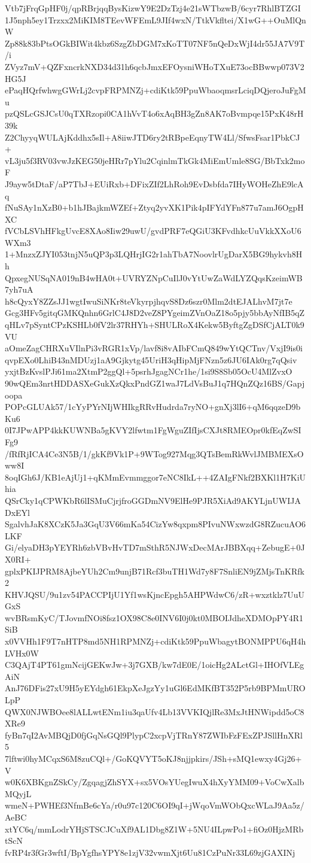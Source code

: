Vtb7jFrqGpHF0j/qpRBrjqqBysKizwY9E2DzTzj4e21sWTbzwB/6cyr7RhlBTZGI
1J5nph5ey1Trzxx2MiKIM8TEevWFEmL9JIf4wxN/TtkVkfltei/X1wG++OuMlQnW
Zp88k83bPtsOGkBIWit4kbz6SzgZbDGM7xKoTT07NF5nQeDxWjI4dr55JA7V9T/i
ZVyz7mV+QZFxncrkNXD34d31h6qcbJmxEFOysniWHoTXuE73ocBBwwp073V2HG5J
ePaqHQrfwhwgGWrLj2cvpFRPMNZj+cdiKtk59PpuWbaoqmsrLciqDQjeroJuFgMu
pzQSLcGSJCsU0qTXRzopi0CA1hVvT4o6xAqBH3gZn8AK7oBvmpqe15PxK48rH39k
Z2ChyyqWULAjKddhx5sIl+A8iiwJTD6ry2tRBpeEqnyTW4Ll/SfwsFsar1PbkCJ+
vL3ju5f3RV03vwJzKEG50jeHRr7pYlu2CqinlmTkGk4MiEmUmle8SG/BbTxk2moF
J9ayw5tDtaF/aP7TbJ+EUiRxb+DFixZIf2LhRoh9EvDsbfda7IHyWOHeZhE9lcAq
fNuSAy1nXzB0+b1hJBajkmWZEf+Ztyq2yvXK1Pik4pIFYdYFn877u7amJ6OgpHXC
fVCbLSVhHFkgUvcE8XAo8Iiw29uwU/gvdPRF7eQGiU3KFvdhkcUuVkkXXoU6WXm3
1+MnzxZJYI053tnjN5uQP3p3LQHrjIG2r1ahTbA7NoovlrUgDarX5BG9hykvh8Hh
QpxegNUSqNA019nB4wHA0t+UVRYZNpCuIlJ0vYtUwZaWdLYZQqsKzeimWB7yh7uA
h8cQyxY8ZZsJJ1wgtIwuSiNKr8teVkyrpjhqvS8Dz6szr0Mlm2dtEJALhvM7jt7e
Gcg3HFv5gitqGMKQnhn6GrlC4J8D2veZ8PYgeimZVnOaZ18o5pjy5bbAyNfIB5qZ
qHLv7pSyntCPzKSHLb0fV2lr37RHYh+SHULRoX4Kekw5ByftgZgDSfCjALT0k9VU
aOmeZagCHRXuVIlnPi3vRGR1xVp/lavf8i8vAIbFCmQ849wYtQCTnv/VxjI9is0i
qvpEXo0LhiB43nMDUzj1aA9Gjkytg45UriH3qHipMjFNzn5z6JU6IAk0rg7qQsiv
yxjtBzKvslPJi61ma2XtmP2ggQl+5psrhJgagNCr1he/1si9S8Sb05OcU4MlZvxO
90wQEm3nrtHDDASXeGukXzQkxPndGZ1waJ7LdVsBuJ1q7HQnZQz16BS/Gapjoopa
POPcGLUAk57/1cYyPYrNIjWHIkgRRvHudrda7ryNO+gnXj3lI6+qM6qqzeD9bKu6
0I7JPwAPP4kkKUWNBa5gKVY2lfwtm1FgWguZIfIjsCXJt8RMEOpr0kfEqZwSIFg9
/fRfRjICA4Ce3N5B/1/gkKf9Vk1P+9WTog927Mqg3QTsBemRkWvlJMBMEXsOww8I
8oqIGh6J/KB1eAjUj1+qKMmEvmmggor7eNC8IkL++4ZAIgFNkf2BXKl1H7KiUhia
QSrCky1qCPWKbR6lISMuCjrjfroGGDmNV9ElHe9PJR5XiAd9AKYLjnUWIJADxEYl
SgalvhJaK8XCzK5Ja3GqU3V66mKa54CizYw8qxpm8PIvuNWxwzdG8RZucuAO6LKF
Gi/elyaDH3pYEYRh6zbVBvHvTD7mSthR5NJWxDecMArJBBXqq+ZebugE+0JX0RI+
gplxPKIJPRM8AjbeYUh2Cm9unjB71Rcf3buTH1Wd7y8F7SnliEN9jZMjsTnKRfk2
KHVJQSU/9u1zv54PACCPIjU1Yf1wsKjncEpgh5AHPWdwC6/zR+wxztklz7UuUGxS
wvBRsmKyC/TJovmfNOi8fsz1OX98C8e0INV6I0j0kt0MBOIJdheXDMOpPY4R1SiB
x0VVHh1F9T7nHTP8md5NH1RPMNZj+cdiKtk59PpuWbagytBONMPPU6qH4hLVHx0W
C3QAjT4PT61gmNcijGEKwJw+3j7GXB/kw7dE0E/1oicHg2ALctGl+IHOfVLEgAiN
AnJ76DFis27xU9H5yEYdgh61EkpXeJgzYy1uGl6EdMKfBT352P5rb9BPMmUROLpP
QWX0NJWBOee8lALLwtENm1iu3qaUfv4Lb13VVKIQjlRe3MxJtHNWipdd5oC8XRe9
fyBn7qI2AvMBQjD0fjGqNsGQl9PlypC2xcpVjTRnY87ZWIbFzFExZPJSllHnXRl5
7lftwi0hyMCqxS6M8zuCQl+/GoKQVYT5oKJ8njjpkirs/JSh+sMQ1ewxy4Gj26+V
w0K6XBKgnZSkCy/ZgqagjZhSYX+sx5VOsYUegIwuX4hXyYMM09+VoCwXalbMQyjL
wmeN+PWHEf3NfmBe6cYa/r0u97c120C6OI9qI+jWqoVmWObQxcWLaJ9Aa5z/AeBC
xtYC6q/mmLodrYHjSTSCJCuXf9AL1Dbg8Z1W+5NU4ILpwPo1+fiOz0HjzMRbtScN
fvRP4r3fGr3wftI/BpYgfhsYPY8e1zjV32vwmXjt6Uu81CzPuNr33L69zjGAXINj
